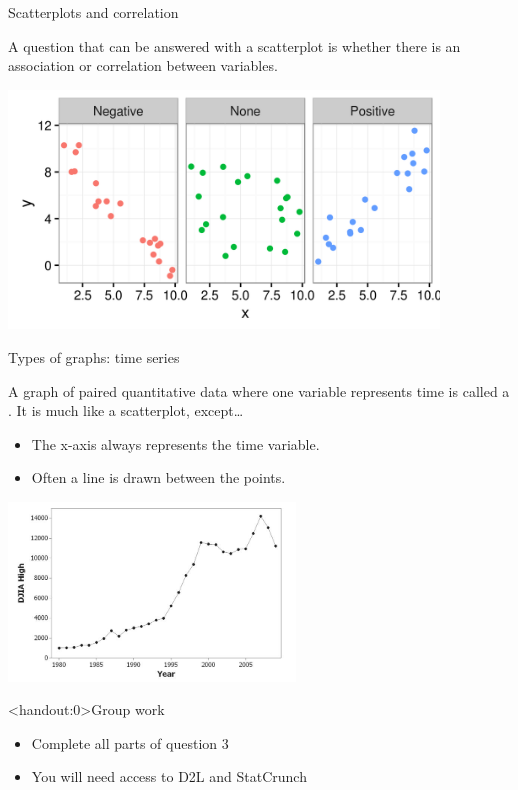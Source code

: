 \documentclass[handout]{beamer}
\begin{document}
\begin{frame}{Scatterplots and correlation}
\begin{block}{}
\large
A question that can be answered with a scatterplot is whether there is an association or correlation between variables.  
\end{block}
\includegraphics[width=4.5in]{../images/ch02_scatter_cor}
\end{frame}

\begin{frame}{Types of graphs: time series}
\begin{block}{}
A graph of paired quantitative data where one variable represents time is called a . It is much like a scatterplot, except\ldots
\begin{itemize}
\item The x-axis always represents the time variable.
\item Often a line is drawn between the points.
\end{itemize}
\end{block}
\bigskip
{\centering
\includegraphics[width=3in]{../images/ch02_timeseries}
\par}

\end{frame}


\begin{frame}<handout:0>{Group work}
\begin{block}{}
\large
\begin{itemize}
\item Complete all parts of question 3
\item You will need access to D2L and StatCrunch
\end{itemize}
\end{block}
\end{frame}
\end{document}
